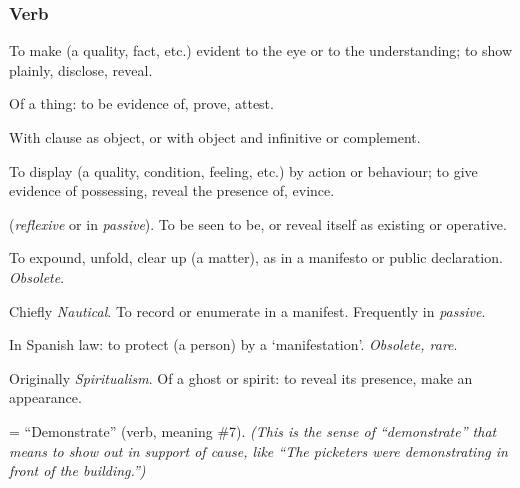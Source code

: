 	\subsubsection{Verb}

		\begin{compactitem}
			\item[1.a] To make (a quality, fact, etc.) evident to the eye or to the understanding; to show plainly, disclose, reveal.
			\item[1.b] Of a thing: to be evidence of, prove, attest.
			\item[1.c] With clause as object, or with object and infinitive or complement.
			\item[2.a] To display (a quality, condition, feeling, etc.) by action or behaviour; to give evidence of possessing, reveal the presence of, evince.
			\item[2.b] (\textit{reflexive} or in \textit{passive}). To be seen to be, or reveal itself as existing or operative.
			\item[3] To expound, unfold, clear up (a matter), as in a manifesto or public declaration. \textit{Obsolete}.
			\item[4] Chiefly \textit{Nautical}. To record or enumerate in a manifest. Frequently in \textit{passive}.
			\item[5] In Spanish law: to protect (a person) by a `manifestation'. \textit{Obsolete, rare}.
			\item[6] Originally \textit{Spiritualism}. Of a ghost or spirit: to reveal its presence, make an appearance.
			\item[7] = ``Demonstrate'' (verb, meaning \#7). \textit{(This is the sense of ``demonstrate'' that means to show out in support of cause, like ``The picketers were demonstrating in front of the building.'')}
		\end{compactitem}


	
